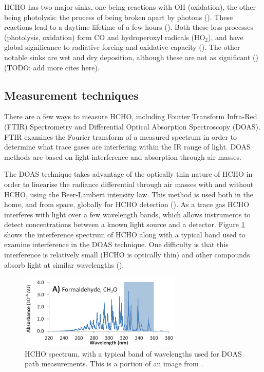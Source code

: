     HCHO has two major sinks, one being reactions with OH (oxidation), the other being photolysis: the process of being broken apart by photons (\cite{Crutzen1999, Wagner2002, Levy1972, Kefauver2014}).
    These reactions lead to a daytime lifetime of a few hours (\cite{Atkinson2000, Millet2006}).
    Both these loss processes (photolysis, oxidation) form CO and hydroperoxyl radicals (HO$_2$), and have global significance to radiative forcing and oxidative capacity (\cite{Franco2015}).
    The other notable sinks are wet and dry deposition, although these are not as significant (\cite{Atkinson2000}) (TODO: add more cites here).
    
  \subsection{Measurement techniques}
    \label{LR:HCHO:Measurements}
    There are a few ways to measure HCHO, including Fourier Transform Infra-Red (FTIR) Spectrometry and Differential Optical Absorption Spectroscopy (DOAS).
    FTIR examines the Fourier transform of a measured spectrum in order to determine what trace gases are interfering within the IR range of light.
    DOAS methods are based on light interference and absorption through air masses.
    
    The DOAS technique takes advantage of the optically thin nature of HCHO in order to linearise the radiance differential through air masses with and without HCHO, using the Beer-Lambert intensity law.
    This method is used both in the home, and from space, globally for HCHO detection (\cite{Guenther1995, Abad2015, Davenport2015}).
    As a trace gas HCHO interferes with light over a few wavelength bands, which allows instruments to detect concentrations between a known light source and a detector.
    Figure \ref{LR:HCHO:Measurements:fig_HCHOSpectrum} shows the interference spectrum of HCHO along with a typical band used to examine interference in the DOAS technique.
    One difficulty is that this interference is relatively small (HCHO is optically thin) and other compounds absorb light at similar wavelengths (\cite{Davenport2015}).
    
    \begin{figure}
      \includegraphics{Figures/HCHO/HCHOAbsorbanceDavenport.png}
      \caption{ %
        HCHO spectrum, with a typical band of wavelengths used for DOAS path measurements.
        This is a portion of an image from \cite{Davenport2015}.}
      \label{LR:HCHO:Measurements:fig_HCHOSpectrum}
    \end{figure}
    
